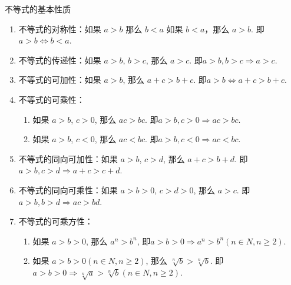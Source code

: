 \begin{property}\label{property:inequality}
不等式的基本性质
\begin{enumerate}
\item 不等式的对称性：如果 $a>b$ 那么 $b<a$ 如果 $b<a$，那么 $a>b$. 即$a>b \iff b<a$.
\item 不等式的传递性：如果 $a>b$, $b>c$, 那么 $a>c$. 即$a>b, b>c \Longrightarrow a>c$.
\item 不等式的可加性：如果 $a>b$, 那么 $a+c>b+c$. 即$a>b \iff a+c>b+c$.
\item 不等式的可乘性：
\begin{enumerate}
\item 如果 $a>b$, $c>0$, 那么 $ac>bc$. 即$a>b, c>0 \Longrightarrow ac>bc$.
\item 如果 $a>b$, $c<0$, 那么 $ac<bc$. 即$a>b, c<0 \Longrightarrow ac<bc$.
\end{enumerate}
\item 不等式的同向可加性：如果 $a>b$, $c>d$, 那么 $a+c>b+d$. 即$a>b, c>d \Longrightarrow a+c>c+d$.
\item 不等式的同向可乘性：如果 $a>b>0$, $c>d>0$, 那么 $a>c$. 即$a>b, b>d \Longrightarrow ac>bd$.
\item 不等式的可乘方性：
\begin{enumerate}
\item 如果 $a>b>0$, 那么 $a^n>b^n$, 即$a>b>0 \Longrightarrow a^n>b^n (n\in N, n \geq 2)$.
\item 如果 $a>b>0 (n \in N, n \geq 2)$, 那么 $\sqrt[n]{b}>\sqrt[n]{b}$. 即$a>b>0 \Longrightarrow \sqrt[n]{a}>\sqrt[n]{b} (n\in N, n \geq 2)$.
\end{enumerate}
\end{enumerate}
\end{property}

